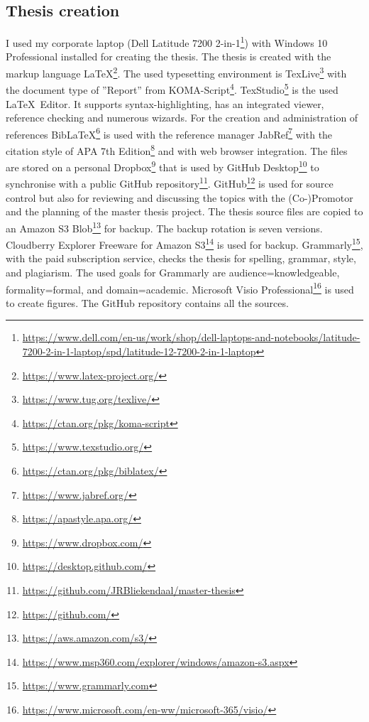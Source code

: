 \subsection{Thesis creation}
\label{sub:tbresearchcreation}
I used my corporate laptop (Dell Latitude 7200 2-in-1\footnote{\url{https://www.dell.com/en-us/work/shop/dell-laptops-and-notebooks/latitude-7200-2-in-1-laptop/spd/latitude-12-7200-2-in-1-laptop}}) with Windows 10 Professional installed for creating the thesis. The thesis is created with the markup language \LaTeX\footnote{\url{https://www.latex-project.org/}}. The used typesetting environment is TexLive\footnote{\url{https://www.tug.org/texlive/}} with the document type of ''Report'' from KOMA-Script\footnote{\url{https://ctan.org/pkg/koma-script}}. TexStudio\footnote{\url{https://www.texstudio.org/}} is the used \LaTeX\ Editor. It supports syntax-highlighting, has an integrated viewer, reference checking and numerous wizards. For the creation and administration of references Bib\LaTeX\footnote{\url{https://ctan.org/pkg/biblatex/}} is used with the reference manager JabRef\footnote{\url{https://www.jabref.org/}} with the citation style of APA 7th Edition\footnote{\url{https://apastyle.apa.org/}} and with web browser integration. The files are stored on a personal Dropbox\footnote{\url{https://www.dropbox.com/}} that is used by GitHub Desktop\footnote{\url{https://desktop.github.com/}} to synchronise with a public GitHub repository\footnote{\url{https://github.com/JRBliekendaal/master-thesis}}. GitHub\footnote{\url{https://github.com/}} is used for source control but also for reviewing and discussing the topics with the (Co-)Promotor and the planning of the master thesis project. The thesis source files are copied to an Amazon S3 Blob\footnote{\url{https://aws.amazon.com/s3/}} for backup. The backup rotation is seven versions. Cloudberry Explorer Freeware for Amazon S3\footnote{\url{https://www.msp360.com/explorer/windows/amazon-s3.aspx}} is used for backup. Grammarly\footnote{\url{https://www.grammarly.com}}, with the paid subscription service, checks the thesis for spelling, grammar,  style, and plagiarism. The used goals for Grammarly are audience=knowledgeable, formality=formal, and domain=academic. Microsoft Visio Professional\footnote{\url{https://www.microsoft.com/en-ww/microsoft-365/visio/}} is used to create figures. The GitHub repository contains all the sources.
